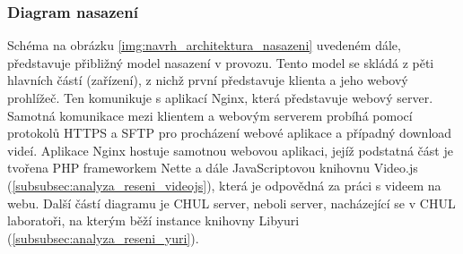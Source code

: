 \documentclass[thesis=M,czech]{FITthesis}[2012/06/26]
\begin{document}
\subsubsection{Diagram nasazení} \label{subsubsec:navrh_architektura_nasazeni}
Schéma na obrázku \ref{img:navrh_architektura_nasazeni} uvedeném dále, představuje přibližný model nasazení v provozu. Tento model se skládá z pěti hlavních částí (zařízení), z nichž první představuje klienta a jeho webový prohlížeč. Ten komunikuje
s aplikací Nginx, která představuje webový server. Samotná komunikace mezi klientem a webovým serverem probíhá pomocí protokolů HTTPS a SFTP pro procházení webové aplikace a případný download videí. Aplikace Nginx hostuje samotnou webovou aplikaci, jejíž podstatná část je tvořena PHP frameworkem Nette a dále JavaScriptovou knihovnu Video.js (\ref{subsubsec:analyza_reseni_videojs}), která je odpovědná za práci s videem na webu. Další částí diagramu je CHUL server, neboli server, nacházející se v CHUL laboratoři, na kterým běží instance knihovny Libyuri (\ref{subsubsec:analyza_reseni_yuri}).  
\end{document}
